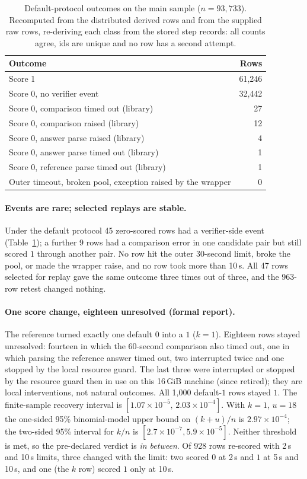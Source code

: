 \documentclass[10pt,a4paper]{article}
\begin{document}
\begin{table}[h]
\centering
\caption{Default-protocol outcomes on the main sample ($n=93{,}733$).
Recomputed from the distributed derived rows and
from the supplied raw rows, re-deriving each class from the stored step
records: all counts agree, ids are unique and no row has a second attempt.}
\label{tab:default}
\small
\begin{tabular}{@{}lr@{}}
\toprule
Outcome & Rows \\
\midrule
Score 1 & 61,246 \\
Score 0, no verifier event & 32,442 \\
Score 0, comparison timed out (library) & 27 \\
Score 0, comparison raised (library) & 12 \\
Score 0, answer parse raised (library) & 4 \\
Score 0, answer parse timed out (library) & 1 \\
Score 0, reference parse timed out (library) & 1 \\
Outer timeout, broken pool, exception raised by the wrapper & 0 \\
\bottomrule
\end{tabular}
\end{table}

\paragraph{Events are rare; selected replays are stable.}
Under the default protocol 45 zero-scored rows had a verifier-side event
(Table~\ref{tab:default}); a further 9 rows had a comparison error in one
candidate pair but still scored $1$ through another pair. No row hit the outer 30-second limit, broke the pool, or made the wrapper
raise, and no row took more than 10\,s. All 47 rows selected for replay gave
the same outcome three times out of three, and the 963-row retest changed
nothing.

\paragraph{One score change, eighteen unresolved (formal report).}
The reference turned exactly one default $0$ into a $1$ ($k=1$). Eighteen rows
stayed unresolved: fourteen in which the 60-second comparison also timed out,
one in which parsing the reference answer timed out, two interrupted twice and
one stopped by the local resource guard. The last three were interrupted or
stopped by the resource guard then in use on this 16\,GiB machine (since
retired); they are local interventions, not natural outcomes. All 1,000 default-$1$ rows stayed $1$.
The finite-sample recovery interval is
$[1.07\times10^{-5},\,2.03\times10^{-4}]$. With $k=1$, $u=18$ the
one-sided 95\% binomial-model upper bound on $(k+u)/n$ is
$2.97\times10^{-4}$; the two-sided 95\% interval for $k/n$ is
$[2.7\times10^{-7}, 5.9\times10^{-5}]$. Neither threshold is met, so the
pre-declared verdict is \emph{in between}. Of 928 rows re-scored with 2\,s
and 10\,s limits, three changed with the limit: two scored $0$ at 2\,s and $1$
at 5\,s and 10\,s, and one (the $k$ row) scored $1$ only at 10\,s.
\end{document}
